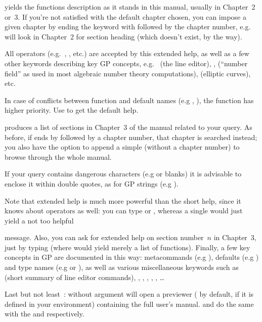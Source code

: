  yields the functions description as it stands in this
manual, usually in Chapter~2 or~3. If you're not satisfied with the default
chapter chosen, you can impose a given chapter by ending the keyword with
 followed by the chapter number, e.g.~ will look in
Chapter~2 for section heading  (which doesn't exist, by the way).

All operators (e.g.~\kbd{+}, \kbd{\&\&}, etc.) are accepted by this
extended help, as well as a few other keywords describing key GP concepts,
e.g.~ (the line editor), ,  (``number
field'' as used in most algebraic number theory computations), 
(elliptic curves), etc.

In case of conflicts between function and default names (e.g ,
), the function has higher priority. Use  to get the default help.

 produces a list of sections in Chapter~3 of the
manual related to your query. As before, if  ends by 
followed by a chapter number, that chapter is searched instead; you also
have the option to append a simple  (without a chapter number) to
browse through the whole manual.

If your query contains dangerous characters (e.g  or blanks) it is
advisable to enclose it within double quotes, as for GP strings (e.g
).

Note that extended help is much more powerful than the short help, since
it knows about operators as well: you can type  or
, whereas a single  would just yield a not too helpful


\noindent message. Also, you can ask for extended help on section
number~$n$ in Chapter~3, just by typing  (where  would
yield merely a list of functions). Finally, a few key concepts in GP are
documented in this way: metacommands (e.g ), defaults (e.g
) and type names (e.g  or ), as well as
various miscellaneous keywords such as  (short summary of line
editor commands), , , ,
, , \dots

Last but not least~:  without argument will open a 
previewer ( by default,  if it is defined in your
environment) containing the full user's manual.  and
 do the same with the  and 
respectively.

